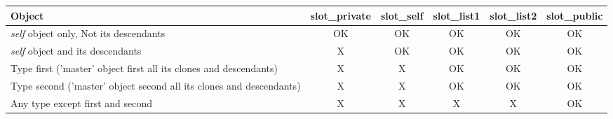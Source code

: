 \documentclass[11pt]{mybook}
\begin{document}
\noindent
\begin{tabularx}{\textwidth}{X c c c c c}
\hline
{\bf{}Object} & {\bf{}slot\_private} & {\bf{}slot\_self} & {\bf{}slot\_list1} & {\bf{}slot\_list2} & {\bf{}slot\_public}\\
\hline
\hline
{{\it{}self} object only, Not its descendants} & {\sc{}OK} & {\sc{}OK} & {\sc{}OK} & {\sc{}OK} & {\sc{}OK} \\
\hline
{{\it{}self} object and its descendants} & {\sc{}X}  & {\sc{}OK} & {\sc{}OK} & {\sc{}OK} & {\sc{}OK} \\
\hline
{Type {\sc{}first} ('master' object {\sc{}first} all its clones and descendants)} & {\sc{}X}  & {\sc{}X}  & {\sc{}OK} & {\sc{}OK} & {\sc{}OK}\\
\hline
{Type {\sc{}second} ('master' object {\sc{}second} all its clones and descendants)} & {\sc{}X}  & {\sc{}X}  & {\sc{}OK} & {\sc{}OK} & {\sc{}OK}\\
\hline
Any type except {\sc{}first} and {\sc{}second}    & {\sc{}X} & {\sc{}X}& {\sc{}X} & {\sc{}X} & {\sc{}OK} \\
\hline
\end{tabularx}
\end{document}
